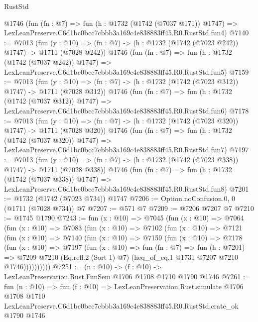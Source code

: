 \begin{lexlean}{RustStd}
\begin{coremodule}
    @1746
    (fun (fn : @7) =>
    fun (h : @1732 (@1742 (@7037 @171)) @1747) =>
    LexLeanPreserve.C6d1bc0bcc7cbbb3a169c4e838883ff45.R0.RustStd.fun4)
@7140 := @7013
    (fun (y : @10) => (fn : @7) -> (h : @1732 (@1742 (@7023 @242)) @1747) -> @1711 (@7028 @242))
    @1746
    (fun (fn : @7) =>
    fun (h : @1732 (@1742 (@7037 @242)) @1747) =>
    LexLeanPreserve.C6d1bc0bcc7cbbb3a169c4e838883ff45.R0.RustStd.fun5)
@7159 := @7013
    (fun (y : @10) => (fn : @7) -> (h : @1732 (@1742 (@7023 @312)) @1747) -> @1711 (@7028 @312))
    @1746
    (fun (fn : @7) =>
    fun (h : @1732 (@1742 (@7037 @312)) @1747) =>
    LexLeanPreserve.C6d1bc0bcc7cbbb3a169c4e838883ff45.R0.RustStd.fun6)
@7178 := @7013
    (fun (y : @10) => (fn : @7) -> (h : @1732 (@1742 (@7023 @320)) @1747) -> @1711 (@7028 @320))
    @1746
    (fun (fn : @7) =>
    fun (h : @1732 (@1742 (@7037 @320)) @1747) =>
    LexLeanPreserve.C6d1bc0bcc7cbbb3a169c4e838883ff45.R0.RustStd.fun7)
@7197 := @7013
    (fun (y : @10) => (fn : @7) -> (h : @1732 (@1742 (@7023 @338)) @1747) -> @1711 (@7028 @338))
    @1746
    (fun (fn : @7) =>
    fun (h : @1732 (@1742 (@7037 @338)) @1747) =>
    LexLeanPreserve.C6d1bc0bcc7cbbb3a169c4e838883ff45.R0.RustStd.fun8)
@7201 := @1732 (@1742 (@7023 @734)) @1747
@7206 := Option.noConfusion.{0, 0} (@1711 (@7028 @734)) @7
@7207 := @571 @7
@7209 := @7206 @7207 @7
@7210 := @1745 @1790
@7243 := fun (x : @10) =>
  @7045
    (fun (x : @10) =>
    @7064
      (fun (x : @10) =>
      @7083
        (fun (x : @10) =>
        @7102
          (fun (x : @10) =>
          @7121
            (fun (x : @10) =>
            @7140
              (fun (x : @10) =>
              @7159
                (fun (x : @10) =>
                @7178
                  (fun (x : @10) =>
                  @7197
                    (fun (x : @10) =>
                    fun (fn : @7) =>
                    fun (h : @7201) =>
                    @7209
                      @7210
                      (Eq.refl.{2} (Sort 1) @7)
                      (heq_of_eq.{1} @1731 @7207 @7210 @1746))))))))))
@7251 := (n : @10) -> (f : @10) -> LexLeanPreservation.Rust.FunSem @1706 @1708 @1710 @1790 @1746
@7261 := fun (n : @10) =>
  fun (f : @10) =>
  LexLeanPreservation.Rust.simulate
    @1706
    @1708
    @1710
    LexLeanPreserve.C6d1bc0bcc7cbbb3a169c4e838883ff45.R0.RustStd.crate_ok
    @1790
    @1746
\end{coremodule}
\end{lexlean}
